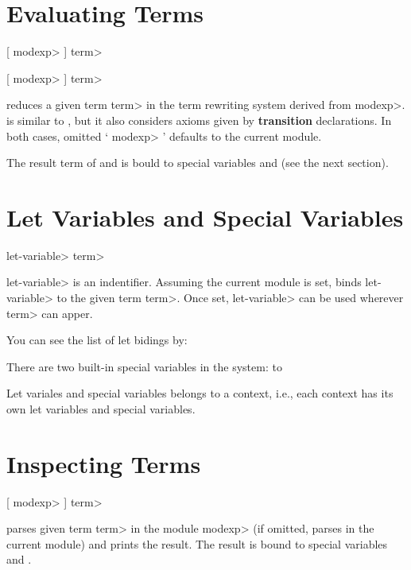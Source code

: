 \section{Evaluating Terms}

 [ \<modexp> \kbd{:}] \<term> 

 [ \<modexp> \kbd{:}] \<term> 

 reduces a given term \<term> in the term rewriting system
derived from \<modexp>.
 is similar to , but it also considers axioms 
given by {\bf transition} declarations.
In both cases, omitted ` \<modexp> \kbd{:}' defaults to the current module.

The result term of  and  is bould to 
special variables  and  (see the next
section). 

\section{Let Variables and Special Variables}

 \<let-variable> \kbd{=} \<term> 

\<let-variable> is an indentifier. Assuming the current module is set, 
 binds \<let-variable> to the given term \<term>.
Once set, \<let-variable> can be used wherever \<term> can apper.

You can see the list of let bidings by:


There are two built-in special variables in the system:
\paralign to 

Let variales and special variables belongs to a context, i.e., each
context has its own let variables and special variables.

\section{Inspecting Terms}
 [ \<modexp> \kbd{:}] \<term> 

 parses given term \<term> in the module \<modexp> (if
omitted, parses in the current module) and prints the result.
The result is bound to special variables  and
. 

